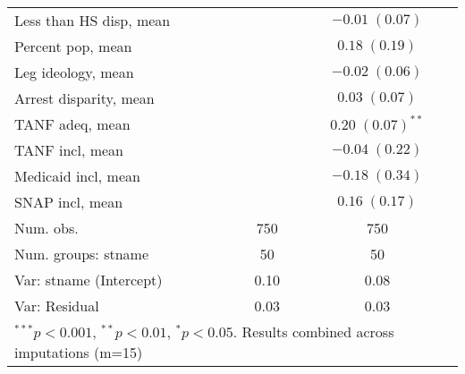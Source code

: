 \begin{table}
\begin{center}
\begin{tabular}{l c c }
Less than HS disp, mean    &                         & $-0.01 \; (0.07)$       \\
Percent pop, mean          &                         & $0.18 \; (0.19)$        \\
Leg ideology, mean         &                         & $-0.02 \; (0.06)$       \\
Arrest disparity, mean     &                         & $0.03 \; (0.07)$        \\
TANF adeq, mean            &                         & $0.20 \; (0.07)^{**}$   \\
TANF incl, mean            &                         & $-0.04 \; (0.22)$       \\
Medicaid incl, mean        &                         & $-0.18 \; (0.34)$       \\
SNAP incl, mean            &                         & $0.16 \; (0.17)$        \\
\hline
Num. obs.                  & 750                     & 750                     \\
Num. groups: stname        & 50                      & 50                      \\
Var: stname (Intercept)    & 0.10                    & 0.08                    \\
Var: Residual              & 0.03                    & 0.03                    \\
\hline
\multicolumn{3}{l}{\scriptsize{$^{***}p<0.001$, $^{**}p<0.01$, $^*p<0.05$. Results combined across imputations (m=15)}}
\end{tabular}
\label{table:coefficients}
\end{center}
\end{table}
